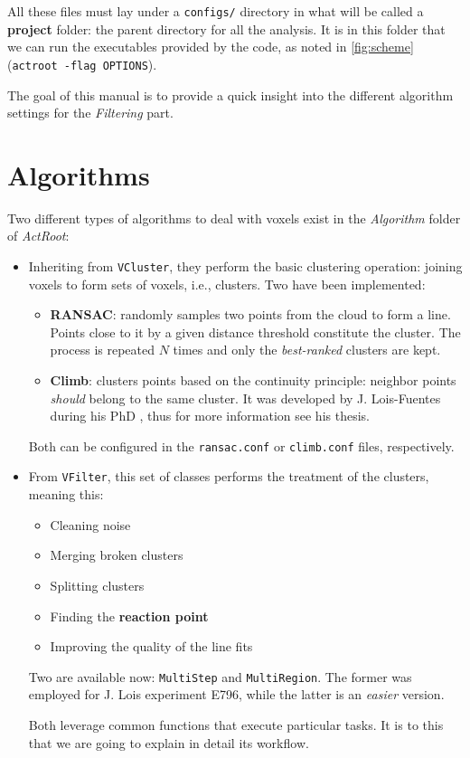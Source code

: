 \documentclass[11pt, a4paper, english]{article}
\begin{document}
All these files must lay under a \lstinline|configs/| directory in what will be called a \textbf{project} folder: the parent directory for all the analysis. It is in this folder that we can run the executables provided by the code, as noted in \autoref{fig:scheme} (\lstinline|actroot -flag OPTIONS|).

The goal of this manual is to provide a quick insight into the different algorithm settings for the \textit
{Filtering} part.

\section{Algorithms}\label{sec:2}
Two different types of algorithms to deal with voxels exist in the \textit{Algorithm} folder of \textit{ActRoot}:
\begin{itemize}
	\item Inheriting from \lstinline{VCluster}, they perform the basic clustering operation: joining voxels to form sets of voxels, i.e., clusters. Two have been implemented:
	      \begin{itemize}
		      \item \textbf{RANSAC}: randomly samples two points from the cloud to form a line. Points close to it by a given distance threshold constitute the cluster. The process is repeated $N$ times and only the \textit{best-ranked} clusters are kept.
		      \item \textbf{Climb}: clusters points based on the continuity principle: neighbor points \textit{should} belong to the same cluster. It was developed by J. Lois-Fuentes during his PhD \cite{lois23}, thus for more information see his thesis.
	      \end{itemize}
	      Both can be configured in the \verb|ransac.conf| or \verb|climb.conf| files, respectively.
	\item From \lstinline|VFilter|, this set of classes performs the treatment of the clusters, meaning this:
	      \begin{itemize}
		      \item Cleaning noise
		      \item Merging broken clusters
		      \item Splitting clusters
		      \item Finding the \textbf{reaction point}
		      \item Improving the quality of the line fits
	      \end{itemize}
	      Two are available now: \lstinline|MultiStep| and \lstinline|MultiRegion|. The former was employed for J. Lois experiment E796, while the latter is an \textit{easier} version.

	      Both leverage common functions that execute particular tasks. It is to this that we are going to explain in detail its workflow.
\end{itemize}
\end{document}

